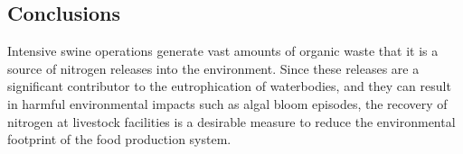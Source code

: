 \begin{refsection}[referencesCh6]







\section{Conclusions}
Intensive swine operations generate  vast amounts of organic waste that it is a source of nitrogen releases into the environment. Since these releases are a significant contributor to the eutrophication of waterbodies, and they can result in harmful environmental impacts such as algal bloom episodes, the recovery of nitrogen at livestock facilities is a desirable measure to reduce the environmental footprint of the food production system.


\end{refsection}
